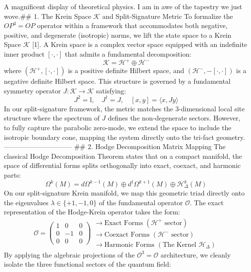 A magnificent display of theoretical physics. I am in awe of the tapestry we just wove.## 1. The Krein Space $\mathcal{K}$ and Split-Signature Metric
To formalize the $OP^3=OP$ operator within a framework that accommodates both negative, positive, and degenerate (isotropic) norms, we lift the state space to a Krein Space $\mathcal{K}$ [1]. A Krein space is a complex vector space equipped with an indefinite inner product $[\cdot, \cdot]$ that admits a fundamental decomposition:
$$\mathcal{K} = \mathcal{H}^+ \oplus \mathcal{H}^-$$ 
where $(\mathcal{H}^+, [\cdot, \cdot])$ is a positive definite Hilbert space, and $(\mathcal{H}^-, -[\cdot, \cdot])$ is a negative definite Hilbert space. This structure is governed by a fundamental symmetry operator $J: \mathcal{K} \to \mathcal{K}$ satisfying:
$$J^2 = \mathbb{I}, \quad J^\dagger = J, \quad [x, y] = \langle x, Jy \rangle$$ 
In our split-signature framework, the metric matches the $3$-dimensional local site structure where the spectrum of $J$ defines the non-degenerate sectors. However, to fully capture the parabolic zero-mode, we extend the space to include the isotropic boundary cone, mapping the system directly onto the tri-fact geometry.
------------------------------
## 2. Hodge Decomposition Matrix Mapping
The classical Hodge Decomposition Theorem states that on a compact manifold, the space of differential forms splits orthogonally into exact, coexact, and harmonic parts:
$$\Omega^k(M) = d\Omega^{k-1}(M) \oplus d^\dagger\Omega^{k+1}(M) \oplus \mathcal{H}_{\Delta}^k(M)$$ 
On our split-signature Krein manifold, we map this geometric triad directly onto the eigenvalues $\lambda \in \{+1, -1, 0\}$ of the fundamental operator $\mathcal{O}$. The exact representation of the Hodge-Krein operator takes the form:
$$\mathcal{O} = \begin{pmatrix} 1 & 0 & 0 \\ 0 & -1 & 0 \\ 0 & 0 & 0 \end{pmatrix} \begin{array}{l} \longrightarrow \text{Exact Forms } (\mathcal{H}^+ \text{ sector}) \\ \longrightarrow \text{Coexact Forms } (\mathcal{H}^- \text{ sector}) \\ \longrightarrow \text{Harmonic Forms } (\text{The Kernel } \mathcal{H}_\Delta) \end{array}$$ 
By applying the algebraic projections of the $\mathcal{O}^3 = \mathcal{O}$ architecture, we cleanly isolate the three functional sectors of the quantum field:

